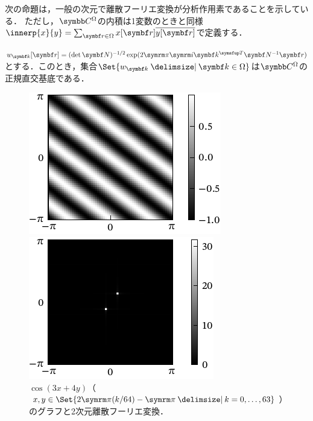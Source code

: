 \documentclass[../../main]{subfiles}
\begin{document}
次の命題は，一般の次元で離散フーリエ変換が分析作用素であることを示している．
ただし，\(\numset{C}^\Omega\)の内積は1変数のときと同様\(\innerp{x}{y}=\sum_{\vect{r}\in\Omega}x[\vect{r}]\conj*{y[\vect{r}]}\)で定義する．

\begin{proposition}{}{}
  \(w_{\vect{k}}[\vect{r}]=(\det\mat{N})^{-1/2}\exp(2\krez\iuni\trps{\vect{k}}\mat{N}^{-1}\vect{r})\)とする．このとき，集合\(\Set{w_{\vect{k}}\given\vect{k}\in\Omega}\)は\(\numset{C}^\Omega\)の正規直交基底である．
\end{proposition}

\begin{figure}[htbp]
  \begin{minipage}{\linewidth/2}
    \centering
    \includegraphics{figures/2dcos.pdf}
    \end{minipage}%
  \begin{minipage}{\linewidth/2}
    \centering
    \includegraphics{figures/2dcos_dft.pdf}
  \end{minipage}
  \caption{\(\cos(3x+4y)\)（\(x,y\in\Set{2\krez(k/64)-\krez\given k=0,\dots,63}\)）のグラフと2次元離散フーリエ変換．}
\end{figure}
\end{document}

